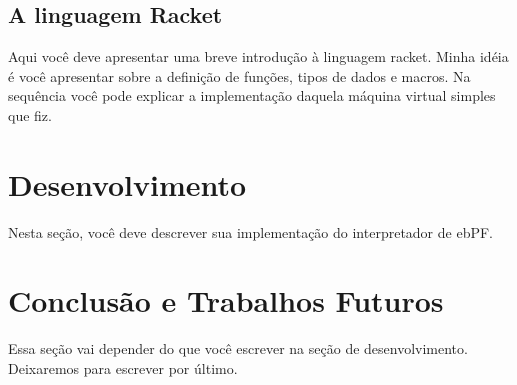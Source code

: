 \documentclass[paper=a4, fontsize=12pt]{article}
\theoremstyle{definition}
\begin{document}
\subsection{A linguagem Racket}

Aqui você deve apresentar uma breve introdução à linguagem
racket. Minha idéia é você apresentar sobre a definição de funções,
tipos de dados e macros. Na sequência você pode explicar a implementação daquela
máquina virtual simples que fiz.

\section{Desenvolvimento}

Nesta seção, você deve descrever sua implementação do interpretador de ebPF.


\section{Conclusão e Trabalhos Futuros}

Essa seção vai depender do que você escrever na seção de desenvolvimento. Deixaremos
para escrever por último.




\end{document}
